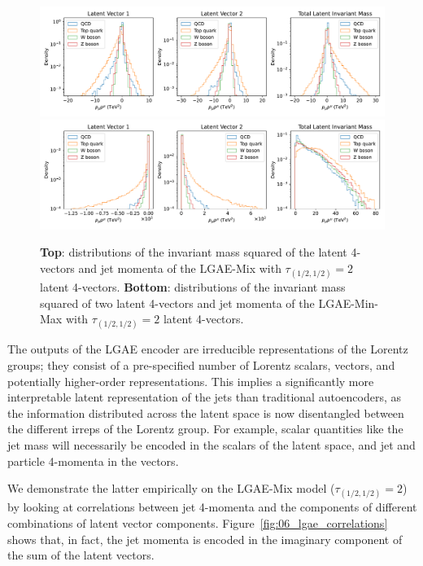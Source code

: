 \begin{figure}[ht!]
    \centering
    \includegraphics[width=\linewidth]{figures/06-ML4Jets/lgae/latent-space-analysis/invariant_masses-mix-log.pdf}
    \includegraphics[width=\linewidth]{figures/06-ML4Jets/lgae/latent-space-analysis/invariant_masses-min_max-selected-log.pdf}
    \caption[Distributions of the invariant mass squared of the latent 4-vectors and jet momenta of the LGAE models.]{
        \textbf{Top}: distributions of the invariant mass squared of the latent 4-vectors and jet momenta of the LGAE-Mix with $\tau_{(1/2, 1/2)} = 2$ latent 4-vectors.
        \textbf{Bottom}: distributions of the invariant mass squared of two latent 4-vectors and jet momenta of the LGAE-Min-Max with $\tau_{(1/2, 1/2)} = 2$ latent 4-vectors.
    }
    \label{fig:06_lgae_distribution}
\end{figure}


The outputs of the LGAE encoder are irreducible representations of the Lorentz groups; they consist of a pre-specified number of Lorentz scalars, vectors, and potentially higher-order representations.
This implies a significantly more interpretable latent representation of the jets than traditional autoencoders, as the information distributed across the latent space is now disentangled between the different irreps of the Lorentz group.
For example, scalar quantities like the jet mass will necessarily be encoded in the scalars of the latent space, and jet and particle 4-momenta in the vectors.

We demonstrate the latter empirically on the LGAE-Mix model ($\tau_{(1/2, 1/2)} = 2$) by looking at correlations between jet 4-momenta and the components of different combinations of latent vector components.
Figure~\ref{fig:06_lgae_correlations} shows that, in fact, the jet momenta is encoded in the imaginary component of the sum of the latent vectors.

